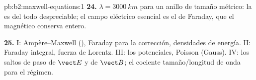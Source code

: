 \begin{solution}{pb:b2:maxwell-equations:1}
\textbf{24.} $\lambda = \qty{3000}{km}$ para un anillo de tamaño métrico: la
 es del todo despreciable; el campo eléctrico
esencial es el de Faraday, que el  magnético
conserva entero.

\textbf{25.} I: Ampère--Maxwell (), Faraday para
la corrección, densidades de energía. II: Faraday integral, fuerza de
Lorentz. III: los potenciales, Poisson (Gauss). IV: los saltos de paso de
$\vect E$ y de $\vect B$; el cociente tamaño/longitud de onda para el régimen.
\end{solution}
